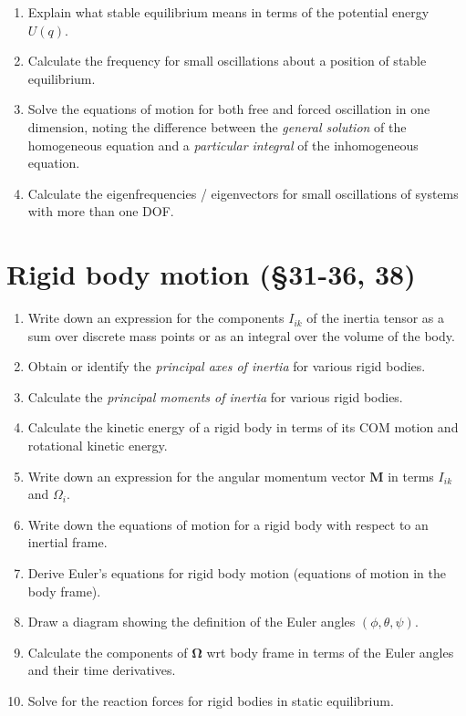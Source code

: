 \documentclass[10pt]{article}
\numberwithin{equation}{section}
\def\ben{\begin{enumerate}}
\def\een{\end{enumerate}}
\def\i{\item{}}
\newcommand{\bs}[1]{\boldsymbol{#1}}
\renewcommand{\vec}[1]{\mathbf{#1}}
\newcommand{\vecs}[1]{\bs{#1}}
\begin{document}
\ben
\i Explain what stable equilibrium means in terms of the 
potential energy $U(q)$.

\i Calculate the frequency for small oscillations about 
a position of stable equilibrium.

\i Solve the equations of motion for both free and 
forced oscillation in one dimension, noting the difference
between the {\em general solution} of the 
homogeneous equation and a {\em particular integral} 
of the inhomogeneous equation.
 
\i Calculate the eigenfrequencies / eigenvectors for
small oscillations of systems with more than one DOF.

\een

\section{Rigid body motion (\S31-36, 38)}

\ben
\i Write down an expression for the components  $I_{ik}$
of the inertia tensor as a sum over discrete mass points 
or as an integral over the volume of the body.

\i Obtain or identify the {\em principal axes of
inertia} for various rigid bodies.

\i Calculate the 
{\em principal moments of inertia} for various rigid bodies.

\i Calculate the kinetic energy of a rigid body in terms of
its COM motion and rotational kinetic energy.

\i Write down an expression for the angular 
momentum vector $\vec M$ in terms $I_{ik}$ and ${\Omega}_i$.

\i Write down the equations of motion for a rigid body with 
respect to an inertial frame.

\i Derive Euler's equations for rigid body motion (equations 
of motion in the body frame).

\i Draw a diagram showing the definition of the Euler angles
$(\phi,\theta,\psi)$.

\i Calculate the components of $\vecs{\Omega}$ wrt body 
frame in terms of the Euler angles and their time derivatives.

\i Solve for the reaction forces for rigid bodies in static equilibrium.
\een
\end{document}
